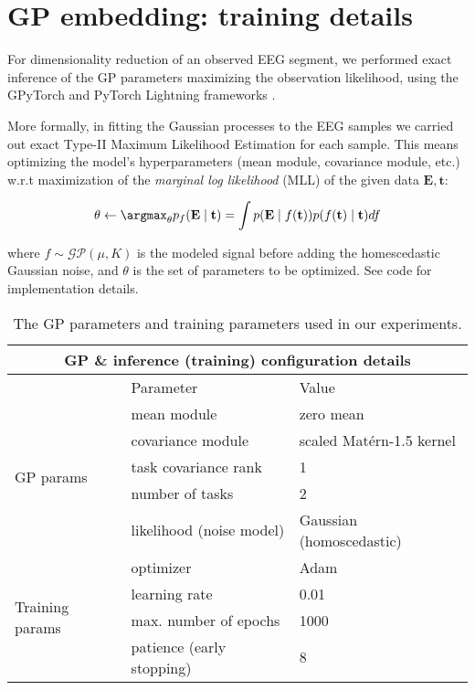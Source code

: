 \appendix
\chapter{GP embedding: training details}
\label{apx:GPTraining}

For dimensionality reduction of an observed EEG segment, we performed exact inference of the GP parameters maximizing the observation likelihood, using the GPyTorch and PyTorch Lightning frameworks  \cite{gardner2018gpytorch, Falcon_PyTorch_Lightning_2019}.

More formally, in fitting the Gaussian processes to the EEG samples we carried out exact Type-II Maximum Likelihood Estimation for each sample. This means optimizing the model's hyperparameters (mean module, covariance module, etc.) w.r.t maximization of the \emph{marginal log likelihood} (MLL) of the given data $\mathbf{E, t}$:

\begin{align}
    \theta \gets \argmax_\theta p_f(\mathbf{E} \mid \mathbf{t}) = \int p(\mathbf{E} \mid f(\mathbf{t})) p(f(\mathbf{t}) \mid \mathbf{t}) df
\end{align}

where $f \sim \mathcal{GP}(\mu, K)$ is the modeled signal before adding the homescedastic Gaussian noise, and $\theta$ is the set of parameters to be optimized. See code for implementation details.

\begin{table}[h]
\begin{tabular}{ |p{3cm}||p{5cm}||p{5cm}| }
 \hline
 \multicolumn{3}{|c|}{GP \& inference (training) configuration details} \\
 \hline
  &Parameter& Value \\
 \hline
\multirow{5}{3cm}{GP params} & mean module & zero mean\\
&covariance module& scaled Matérn-1.5 kernel\\
&task covariance rank& 1 \\
&number of tasks& 2   \\
&likelihood (noise model)&Gaussian (homoscedastic)\\
\hline
\multirow{4}{3cm}{Training params}& optimizer &Adam\\
&learning rate& 0.01 \\
&max. number of epochs & 1000\\
&patience (early stopping)&8 \\
 \hline
\end{tabular}
\caption{The GP parameters and training parameters used in our experiments.}
\label{table:GPTraining}
\end{table}
